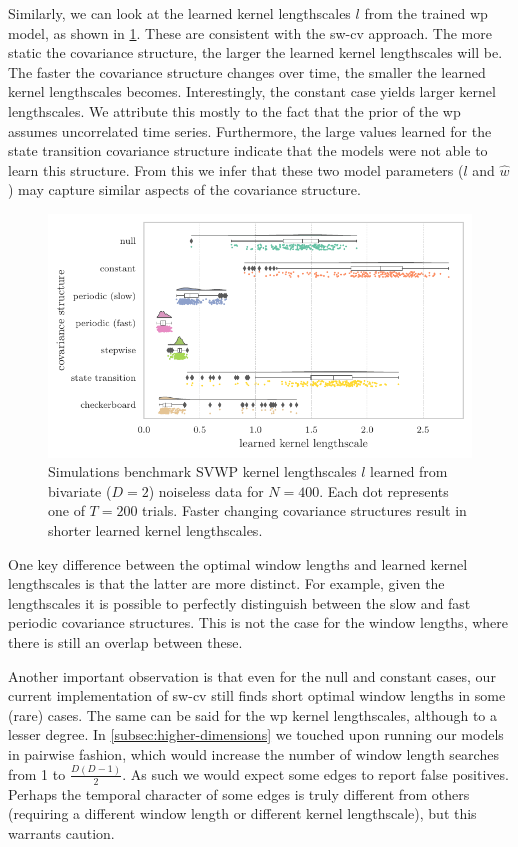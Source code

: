 Similarly, we can look at the learned kernel lengthscales $l$ from the trained \gls{wp} model, as shown in \cref{fig:sim-learned-kernel-lengthscales}.
These are consistent with the \gls{sw-cv} approach.
The more static the covariance structure, the larger the learned kernel lengthscales will be.
The faster the covariance structure changes over time, the smaller the learned kernel lengthscales becomes.
Interestingly, the constant case yields larger kernel lengthscales.
We attribute this mostly to the fact that the prior of the \gls{wp} assumes uncorrelated time series.
Furthermore, the large values learned for the state transition covariance structure indicate that the models were not able to learn this structure.
%
From this we infer that these two model parameters ($l$ and $\hat{w}$) may capture similar aspects of the covariance structure.


\begin{figure}[t]
  \centering
  \includegraphics[width=\textwidth]{fig/sim/d2/N0400_T0200/no_noise/SVWP_kernel_lengthscales}
  \caption{
    Simulations benchmark SVWP kernel lengthscales $l$ learned from bivariate ($D = 2$) noiseless data for $N = 400$.
    Each dot represents one of $T = 200$ trials.
    Faster changing covariance structures result in shorter learned kernel lengthscales.
  }\label{fig:sim-learned-kernel-lengthscales}
\end{figure}


One key difference between the optimal window lengths and learned kernel lengthscales is that the latter are more distinct.
For example, given the lengthscales it is possible to perfectly distinguish between the slow and fast periodic covariance structures.
This is not the case for the window lengths, where there is still an overlap between these.

Another important observation is that even for the null and constant cases, our current implementation of \gls{sw-cv} still finds short optimal window lengths in some (rare) cases.
The same can be said for the \gls{wp} kernel lengthscales, although to a lesser degree.
In \cref{subsec:higher-dimensions} we touched upon running our models in pairwise fashion, which would increase the number of window length searches from 1 to $\frac{D (D - 1)}{2}$.
As such we would expect some edges to report false positives.
Perhaps the temporal character of some edges is truly different from others (requiring a different window length or different kernel lengthscale), but this warrants caution.

